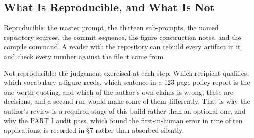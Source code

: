 \subsection{What Is Reproducible, and What Is Not}

Reproducible: the master prompt, the thirteen sub-prompts, the named repository
sources, the commit sequence, the figure construction notes, and the compile
command. A reader with the repository can rebuild every artifact in it and
check every number against the file it came from.

Not reproducible: the judgement exercised at each step. Which recipient
qualifies, which vocabulary a figure needs, which sentence in a 123-page policy
report is the one worth quoting, and which of the author's own claims is wrong,
these are decisions, and a second run would make some of them differently. That
is why the author's review is a required stage of this build rather than an
optional one, and why the PART I audit pass, which found the first-in-human
error in nine of ten applications, is recorded in \S7 rather than absorbed
silently.
